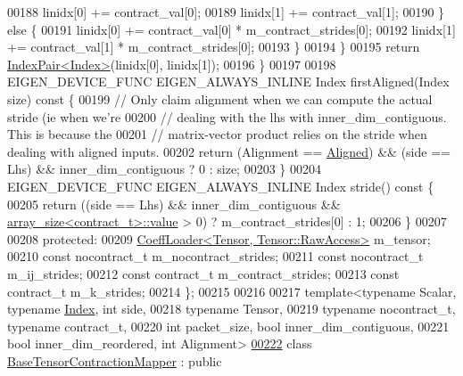 \begin{DoxyCode}
00188         linidx[0] += contract\_val[0];
00189         linidx[1] += contract\_val[1];
00190       \} \textcolor{keywordflow}{else} \{
00191         linidx[0] += contract\_val[0] * m\_contract\_strides[0];
00192         linidx[1] += contract\_val[1] * m\_contract\_strides[0];
00193       \}
00194     \}
00195     \textcolor{keywordflow}{return} \hyperlink{struct_eigen_1_1_index_pair}{IndexPair<Index>}(linidx[0], linidx[1]);
00196   \}
00197 
00198   EIGEN\_DEVICE\_FUNC EIGEN\_ALWAYS\_INLINE Index firstAligned(Index size)\textcolor{keyword}{ const }\{
00199     \textcolor{comment}{// Only claim alignment when we can compute the actual stride (ie when we're}
00200     \textcolor{comment}{// dealing with the lhs with inner\_dim\_contiguous. This is because the}
00201     \textcolor{comment}{// matrix-vector product relies on the stride when dealing with aligned inputs.}
00202     \textcolor{keywordflow}{return} (Alignment == \hyperlink{group__enums_gga45fe06e29902b7a2773de05ba27b47a1ad37d4c71425bb286e9b4103830538fbf}{Aligned}) && (side == Lhs) && inner\_dim\_contiguous ? 0 : size;
00203   \}
00204   EIGEN\_DEVICE\_FUNC EIGEN\_ALWAYS\_INLINE Index stride()\textcolor{keyword}{ const }\{
00205     \textcolor{keywordflow}{return} ((side == Lhs) && inner\_dim\_contiguous && 
      \hyperlink{struct_eigen_1_1internal_1_1array__size}{array\_size<contract\_t>::value} > 0) ? m\_contract\_strides[0] : 1;
00206   \}
00207 
00208  \textcolor{keyword}{protected}:
00209   \hyperlink{struct_eigen_1_1internal_1_1_coeff_loader}{CoeffLoader<Tensor, Tensor::RawAccess>} m\_tensor;
00210   \textcolor{keyword}{const} nocontract\_t m\_nocontract\_strides;
00211   \textcolor{keyword}{const} nocontract\_t m\_ij\_strides;
00212   \textcolor{keyword}{const} contract\_t m\_contract\_strides;
00213   \textcolor{keyword}{const} contract\_t m\_k\_strides;
00214 \};
00215 
00216 
00217 \textcolor{keyword}{template}<\textcolor{keyword}{typename} Scalar, \textcolor{keyword}{typename} \hyperlink{namespace_eigen_a62e77e0933482dafde8fe197d9a2cfde}{Index}, \textcolor{keywordtype}{int} side,
00218          \textcolor{keyword}{typename} Tensor,
00219          \textcolor{keyword}{typename} nocontract\_t, \textcolor{keyword}{typename} contract\_t,
00220          \textcolor{keywordtype}{int} packet\_size, \textcolor{keywordtype}{bool} inner\_dim\_contiguous,
00221          \textcolor{keywordtype}{bool} inner\_dim\_reordered, \textcolor{keywordtype}{int} Alignment>
\hyperlink{class_eigen_1_1internal_1_1_base_tensor_contraction_mapper}{00222} \textcolor{keyword}{class }\hyperlink{class_eigen_1_1internal_1_1_base_tensor_contraction_mapper}{BaseTensorContractionMapper} : \textcolor{keyword}{public} 

\end{DoxyCode}
